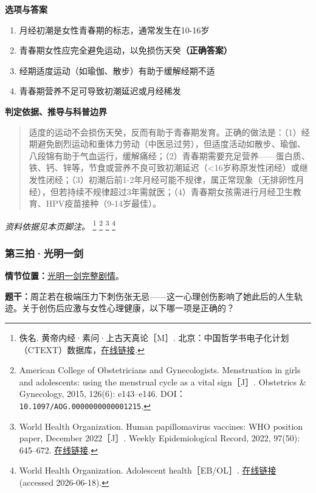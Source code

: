 \textbf{选项与答案}
\begin{enumerate}[label=\Alph*.,leftmargin=*]
  \item 月经初潮是女性青春期的标志，通常发生在10-16岁
  \item 青春期女性应完全避免运动，以免损伤天癸\textbf{（正确答案）}
  \item 经期适度运动（如瑜伽、散步）有助于缓解经期不适
  \item 青春期营养不足可导致初潮延迟或月经稀发
\end{enumerate}
\textbf{判定依据、推导与科普边界}
\begin{quote}适度的运动不会损伤天癸，反而有助于青春期发育。正确的做法是：（1）经期避免剧烈运动和重体力劳动（中医忌过劳），但适度活动如散步、瑜伽、八段锦有助于气血运行，缓解痛经；（2）青春期需要充足营养——蛋白质、铁、钙、锌等，节食或营养不良可致初潮延迟（<16岁称原发性闭经）或继发性闭经；（3）初潮后前1-2年月经可能不规律，属正常现象（无排卵性月经），但若持续不规律超过3年需就医；（4）青春期女孩需进行月经卫生教育、HPV疫苗接种（9-14岁最佳）。\end{quote}
\noindent\textit{资料依据见本页脚注。}
\footnote{佚名. 黄帝内经·素问·上古天真论［M］. 北京：中国哲学书电子化计划（CTEXT）数据库，\href{https://ctext.org/huangdi-neijing/shang-gu-tian-zhen-lun/zh}{在线链接}.}
\footnote{American College of Obstetricians and Gynecologists. Menstruation in girls and adolescents: using the menstrual cycle as a vital sign［J］. Obstetrics \& Gynecology, 2015, 126(6): e143–e146. DOI：\nolinkurl{10.1097/AOG.0000000000001215}.}
\footnote{World Health Organization. Human papillomavirus vaccines: WHO position paper, December 2022［J］. Weekly Epidemiological Record, 2022, 97(50): 645–672. \href{https://www.who.int/publications/i/item/who-wer9750-645-672}{在线链接}.}
\footnote{World Health Organization. Adolescent health［EB/OL］. \href{https://www.who.int/health-topics/adolescent-health/}{在线链接} (accessed 2026-06-18).}

\subsubsection{第三拍·光明一剑}\label{question:zhouzhiruo:3}
\textbf{情节位置：}\hyperref[plot:zhouzhiruo:3]{光明一剑完整剧情}。

\textbf{题干：}周芷若在极端压力下刺伤张无忌——这一心理创伤影响了她此后的人生轨迹。关于创伤后应激与女性心理健康，以下哪一项是正确的？

